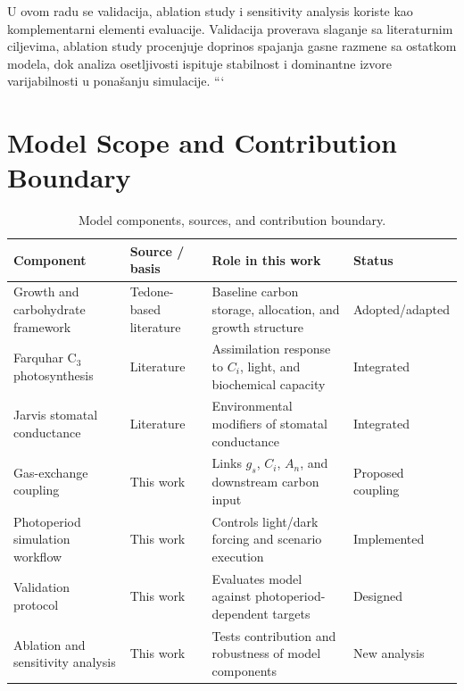 \documentclass[a4paper,fleqn]{cas-dc}
\begin{document}
U ovom radu se validacija, ablation study i sensitivity analysis koriste kao komplementarni elementi evaluacije. Validacija proverava slaganje sa literaturnim ciljevima, ablation study procenjuje doprinos spajanja gasne razmene sa ostatkom modela, dok analiza osetljivosti ispituje stabilnost i dominantne izvore varijabilnosti u ponašanju simulacije.
```


\section{Model Scope and Contribution Boundary}
\label{sec:scope}


\begin{table}[ht]
\centering
\caption{Model components, sources, and contribution boundary.}
\label{tab:component_boundary}
\begin{tabular}{p{} p{} p{} p{}}
\hline
\textbf{Component} & \textbf{Source / basis} & \textbf{Role in this work} & \textbf{Status} \\
\hline
Growth and carbohydrate framework & Tedone-based literature &
Baseline carbon storage, allocation, and growth structure & Adopted/adapted \\

Farquhar C$_3$ photosynthesis & Literature &
Assimilation response to $C_i$, light, and biochemical capacity & Integrated \\

Jarvis stomatal conductance & Literature &
Environmental modifiers of stomatal conductance & Integrated \\

Gas-exchange coupling & This work &
Links $g_s$, $C_i$, $A_n$, and downstream carbon input & Proposed coupling \\

Photoperiod simulation workflow & This work &
Controls light/dark forcing and scenario execution & Implemented \\

Validation protocol & This work &
Evaluates model against photoperiod-dependent targets & Designed \\

Ablation and sensitivity analysis & This work &
Tests contribution and robustness of model components & New analysis \\
\hline
\end{tabular}
\end{table}
\end{document}
